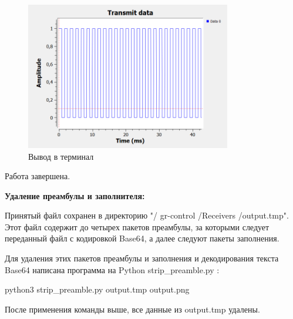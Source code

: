 \documentclass[12pt]{article}
\begin{document}
\begin{enumerate}
\begin{figure}[H]
    \centering
    \includegraphics[width=0.8\textwidth]{pics/a0000-img008.png}
    \caption{Вывод в терминал}
\end{figure}

\end{enumerate}

Работа завершена.
\bigskip

\textbf{Удаление преамбулы и заполнителя:}
\medskip

Принятый файл сохранен в директорию "/ gr-control /Receivers /output.tmp". Этот файл содержит до четырех пакетов преамбулы, за которыми следует переданный файл с кодировкой Base64, а далее следуют пакеты заполнения.

Для удаления этих пакетов преамбулы и заполнения и декодирования текста Base64 написана программа на Python strip\_preamble.py :

python3 strip\_preamble.py output.tmp output.png

После применения команды выше, все данные из output.tmp удалены.
\end{document}

